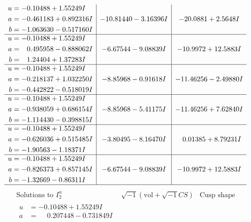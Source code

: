 \documentclass[1p]{elsarticle_modified}
\theoremstyle{definition}
\newcommand{\I}{\sqrt{-1}}
\begin{document}
$$\begin{array}{c|c|c}
\begin{aligned}
u &= -0.10488 + 1.55249 I \\
a &= -0.461183 + 0.892316 I \\
b &= -1.063630 - 0.517160 I\end{aligned}
 & -10.81440 - 3.16396 I & -20.0881 + 2.5648 I \\ \hline\begin{aligned}
u &= -0.10488 + 1.55249 I \\
a &= \phantom{-}0.495958 - 0.888062 I \\
b &= \phantom{-}1.24404 + 1.37283 I\end{aligned}
 & -6.67544 - 9.08839 I & -10.9972 + 12.5883 I \\ \hline\begin{aligned}
u &= -0.10488 + 1.55249 I \\
a &= -0.218137 + 1.032250 I \\
b &= -0.442822 - 0.518019 I\end{aligned}
 & -8.85968 - 0.91618 I & -11.46256 - 2.49880 I \\ \hline\begin{aligned}
u &= -0.10488 + 1.55249 I \\
a &= -0.938059 + 0.686154 I \\
b &= -1.114430 - 0.398815 I\end{aligned}
 & -8.85968 - 5.41175 I & -11.46256 + 7.62840 I \\ \hline\begin{aligned}
u &= -0.10488 + 1.55249 I \\
a &= -0.626036 + 0.515485 I \\
b &= -1.90563 - 1.18371 I\end{aligned}
 & -3.80495 - 8.16470 I & \phantom{-}0.01385 + 8.79231 I \\ \hline\begin{aligned}
u &= -0.10488 + 1.55249 I \\
a &= -0.826373 + 0.857145 I \\
b &= -1.32669 - 0.86311 I\end{aligned}
 & -6.67544 - 9.08839 I & -10.9972 + 12.5883 I\\
 \hline 
 \end{array}$$\newpage$$\begin{array}{c|c|c}  
\text{Solutions to }I^u_{2}& \I (\text{vol} + \sqrt{-1}CS) & \text{Cusp shape}\\
 \hline 
\begin{aligned}
u &= -0.10488 + 1.55249 I \\
a &= \phantom{-}0.207448 - 0.731849 I \\

\end{aligned}
\end{array}$$
\end{document}
